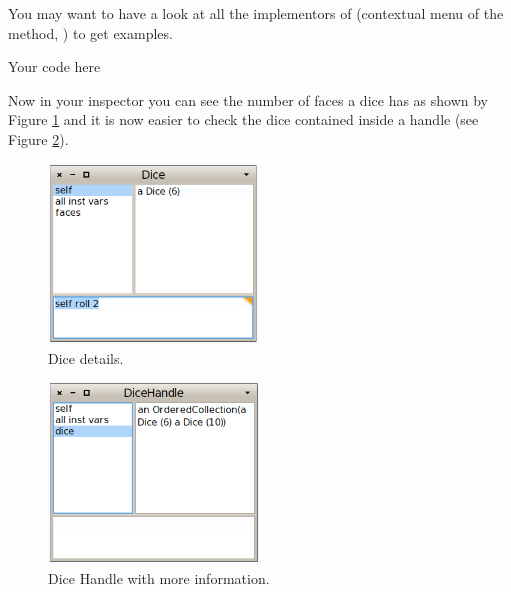 \documentclass[a4paper,10pt,twoside]{book}
\begin{document}
\begin{note}

You may want to have a look at all the implementors of  (contextual menu of the  method, ) to get examples.
\end{note}


\begin{code}{}
Your code here
\end{code}


Now in your inspector you can see the number of faces a dice has as shown by Figure \ref{diceDetail} and it is now easier to check the dice contained inside a handle (see Figure \ref{diceHandleDetail}).


\begin{figure}

\begin{center}
\includegraphics[width=0.5\textwidth]{figures/DiceDetail.png}\caption{Dice details.\label{diceDetail}}\end{center}
\end{figure}



\begin{figure}

\begin{center}
\includegraphics[width=0.5\textwidth]{figures/DiceHandleDetail.png}\caption{Dice Handle with more information.\label{diceHandleDetail}}\end{center}
\end{figure}
\end{document}
